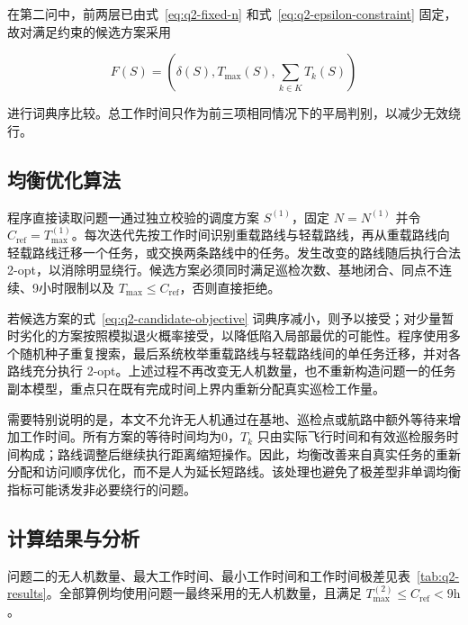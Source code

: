 \documentclass[UTF8,a4paper,12pt]{ctexart}
\numberwithin{equation}{section}
\numberwithin{equation}{section}
\begin{document}
在第二问中，前两层已由式~\eqref{eq:q2-fixed-n} 和式~\eqref{eq:q2-epsilon-constraint} 固定，故对满足约束的候选方案采用

\begin{equation}
  F(S)=
  \left(
    \delta(S),T_{\max}(S),\sum_{k\in K}T_k(S)
  \right)
  \label{eq:q2-candidate-objective}
\end{equation}

进行词典序比较。总工作时间只作为前三项相同情况下的平局判别，以减少无效绕行。

\subsection{均衡优化算法}

程序直接读取问题一通过独立校验的调度方案 \(S^{(1)}\)，固定 \(N=N^{(1)}\) 并令 \(C_{\mathrm{ref}}=T_{\max}^{(1)}\)。每次迭代先按工作时间识别重载路线与轻载路线，再从重载路线向轻载路线迁移一个任务，或交换两条路线中的任务。发生改变的路线随后执行合法 2-opt，以消除明显绕行。候选方案必须同时满足巡检次数、基地闭合、同点不连续、9小时限制以及 \(T_{\max}\leq C_{\mathrm{ref}}\)，否则直接拒绝。

若候选方案的式~\eqref{eq:q2-candidate-objective} 词典序减小，则予以接受；对少量暂时劣化的方案按照模拟退火概率接受，以降低陷入局部最优的可能性。程序使用多个随机种子重复搜索，最后系统枚举重载路线与轻载路线间的单任务迁移，并对各路线充分执行 2-opt。上述过程不再改变无人机数量，也不重新构造问题一的任务副本模型，重点只在既有完成时间上界内重新分配真实巡检工作量。

需要特别说明的是，本文不允许无人机通过在基地、巡检点或航路中额外等待来增加工作时间。所有方案的等待时间均为0，\(T_k\) 只由实际飞行时间和有效巡检服务时间构成；路线调整后继续执行距离缩短操作。因此，均衡改善来自真实任务的重新分配和访问顺序优化，而不是人为延长短路线。该处理也避免了极差型非单调均衡指标可能诱发非必要绕行的问题\cite{matl2018}。

\subsection{计算结果与分析}

问题二的无人机数量、最大工作时间、最小工作时间和工作时间极差见表~\ref{tab:q2-results}。全部算例均使用问题一最终采用的无人机数量，且满足 \(T_{\max}^{(2)}\leq C_{\mathrm{ref}}<9\mathrm{h}\)。
\end{document}

